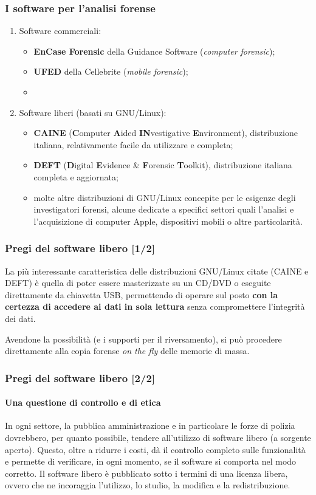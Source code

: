 \documentclass[11pt]{beamer}
\begin{document}
	\begin{frame}
		\frametitle{I software per l'analisi forense}
		\begin{enumerate}
			\item Software commerciali:
			\begin{itemize}
				\item \textbf{EnCase Forensic} della Guidance Software (\textit{computer forensic});
				\item \textbf{UFED} della Cellebrite (\textit{mobile forensic});
				\item \textellipsis
			\end{itemize}
			\item Software liberi (basati su GNU/Linux):
			\begin{itemize}
				\item \textbf{CAINE} (\textbf{C}omputer \textbf{A}ided \textbf{IN}vestigative \textbf{E}nvironment), distribuzione italiana, relativamente facile da utilizzare e completa;
				\item \textbf{DEFT} (\textbf{D}igital \textbf{E}vidence \& \textbf{F}orensic \textbf{T}oolkit), distribuzione italiana completa e aggiornata;
				\item molte altre distribuzioni di GNU/Linux concepite per le esigenze degli investigatori forensi, alcune dedicate a specifici settori quali l'analisi e l'acquisizione di computer Apple, dispositivi mobili o altre particolarità.
			\end{itemize}
		\end{enumerate}
	\end{frame}
	
	
	\begin{frame}
		\frametitle{Pregi del software libero [1/2]}
		La più interessante caratteristica delle distribuzioni GNU/Linux citate (CAINE e DEFT) è quella di poter essere masterizzate su un CD/DVD o eseguite direttamente da chiavetta USB, permettendo di operare sul posto \textbf{con la certezza di accedere ai dati in sola lettura} senza compromettere l'integrità dei dati. 
		
		Avendone la possibilità (e i supporti per il riversamento), si può procedere direttamente alla copia forense \textit{on the fly} delle memorie di massa.
		
	\end{frame}
	
	\begin{frame}
		\frametitle{Pregi del software libero [2/2]}
		\framesubtitle{Una questione di controllo e di etica}
		
		In ogni settore, la pubblica amministrazione e in particolare le forze di polizia dovrebbero, per quanto possibile, tendere all'utilizzo di software libero (a sorgente aperto).
		\vfill
		Questo, oltre a ridurre i costi, dà il controllo completo sulle funzionalità e permette di verificare, in ogni momento, se il software si comporta nel modo corretto.
		\vfill
		Il software libero è pubblicato sotto i termini di una licenza libera, ovvero che ne incoraggia l'utilizzo, lo studio, la modifica e la redistribuzione.
		
	\end{frame}
	
\end{document}
